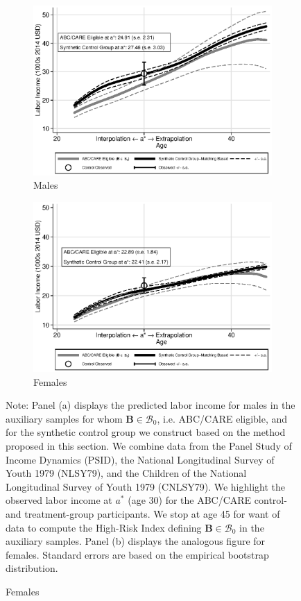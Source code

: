 \begin{figure}
\centering
\caption{Labor Income Profile, Disadvantaged Individuals Synthetic Control Group in the Auxiliary Samples}\label{figure:controltests}
\begin{subfigure}[h]{0.5\textwidth}
		\centering
		\caption{Males}
		\includegraphics[width=\textwidth]{output/abccare_disad_1.eps}
\end{subfigure}%
\begin{subfigure}[h]{0.5\textwidth}
		\centering
		\caption{Females}
		\includegraphics[width=\textwidth]{output/abccare_disad_0.eps}
\end{subfigure}
\footnotesize \justify
Note: Panel (a) displays the predicted labor income for males in the auxiliary samples for whom $\bm{B} \in \mathcal{B}_0$, i.e. ABC/CARE eligible, and for the synthetic control group we construct based on the method proposed in this section. We combine data from the Panel Study of Income Dynamics (PSID), the National Longitudinal Survey of Youth 1979 (NLSY79), and the Children of the National Longitudinal Survey of Youth 1979 (CNLSY79). We highlight the observed labor income at $a^*$ (age 30) for the ABC/CARE control- and treatment-group participants. We stop at age 45 for want of data to compute the High-Risk Index defining $\bm{B} \in \mathcal{B}_0$ in the auxiliary samples. Panel (b) displays the analogous figure for females. Standard errors are based on the empirical bootstrap distribution.
\end{figure}

